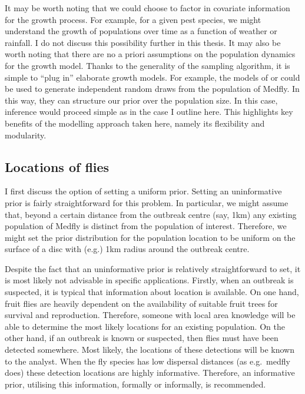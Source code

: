 \documentclass[
]{book}
\begin{document}
It may be worth noting that we could choose to factor in covariate information for the growth process. For example, for a given pest species, we might understand the growth of populations over time as a function of weather or rainfall. I do not discuss this possibility further in this thesis. It may also be worth noting that there are no a priori assumptions on the population dynamics for the growth model. Thanks to the generality of the sampling algorithm, it is simple to ``plug in'' elaborate growth models. For example, the models of \citet{lux2018} or \citet{manoukis2014} could be used to generate independent random draws from the population of Medfly. In this way, they can structure our prior over the population size. In this case, inference would proceed simple as in the case I outline here. This highlights key benefits of the modelling approach taken here, namely its flexibility and modularity.

\hypertarget{locations-of-flies}{%
\subsection{Locations of flies}\label{locations-of-flies}}

I first discuss the option of setting a uniform prior. Setting an uninformative prior is fairly straightforward for this problem. In particular, we might assume that, beyond a certain distance from the outbreak centre (say, 1km) any existing population of Medfly is distinct from the population of interest. Therefore, we might set the prior distribution for the population location to be uniform on the surface of a disc with (e.g.) 1km radius around the outbreak centre.

Despite the fact that an uninformative prior is relatively straightforward to set, it is most likely not advisable in specific applications. Firstly, when an outbreak is suspected, it is typical that information about location is available. On one hand, fruit flies are heavily dependent on the availability of suitable fruit trees for survival and reproduction. Therefore, someone with local area knowledge will be able to determine the most likely locations for an existing population. On the other hand, if an outbreak is known or suspected, then flies must have been detected somewhere. Most likely, the locations of these detections will be known to the analyst. When the fly species has low dispersal distances (as e.g.~medfly does) these detection locations are highly informative. Therefore, an informative prior, utilising this information, formally or informally, is recommended.
\end{document}
